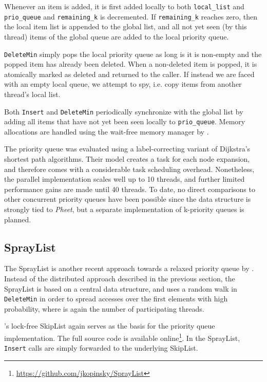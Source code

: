 \documentclass[a4paper,10pt]{article}
\begin{document}
Whenever an item is added, it is first added locally to both \lstinline|local_list| and \lstinline|prio_queue|
and \lstinline|remaining_k| is decremented. If \lstinline|remaining_k| reaches zero, then the local
item list is appended to the global list, and all not yet seen (by this thread) items of the global
queue are added to the local priority queue.

\lstinline|DeleteMin| simply pops the local priority queue as long is it is non-empty and the popped
item has already been deleted. When a non-deleted item is popped, it is atomically marked as deleted
and returned to the caller. If instead we are faced with an empty local queue, we attempt to spy,
i.e. copy items from another thread's local list.

Both \lstinline|Insert| and \lstinline|DeleteMin| periodically synchronize with the global list
by adding all items that have not yet been seen locally to \lstinline|prio_queue|.
Memory allocations are handled using the wait-free memory manager by \citeauthor{wimmer2013wait} \cite{wimmer2013wait}.

The \citeauthor{wimmer2013data} priority queue was evaluated using a label-correcting variant
of Dijkstra's shortest path algorithms. Their model creates a task for each node
expansion, and therefore comes with a considerable task scheduling overhead. Nonetheless,
the parallel implementation scales well up to 10 threads, and further limited performance
gains are made until 40 threads. To date, no direct comparisons to other concurrent
priority queues have been possible since the data structure is strongly tied to \emph{Pheet},
but a separate implementation of k-priority queues is planned.

\subsection{SprayList} \label{sec:spraylist}

The SprayList is another recent approach towards a relaxed priority queue by \citeauthor{alistarhspraylist}
\cite{alistarhspraylist}. Instead of the distributed approach described in the previous section,
the SprayList is based on a central data structure, and uses a random walk in \lstinline|DeleteMin|
in order to spread accesses over the  first elements with high probability, where 
is again the number of participating threads.

\citeauthor{fraser2004practical}'s lock-free SkipList \cite{fraser2004practical} again serves as the
basis for the priority queue implementation. The full source code is available online\footnote{
\url{https://github.com/jkopinsky/SprayList}}. In the SprayList, \lstinline|Insert| calls are simply
forwarded to the underlying SkipList.
\end{document}
